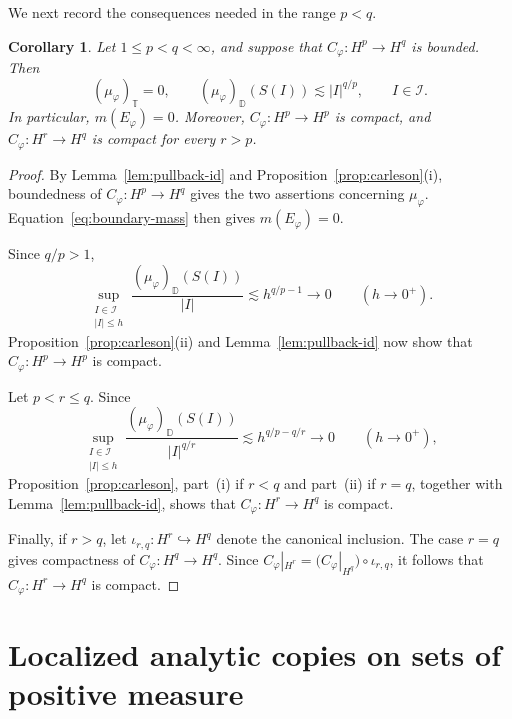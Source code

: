 \documentclass[11pt, reqno]{amsart}
\newtheorem{corollary}[theorem]{Corollary}
\theoremstyle{definition}
\theoremstyle{remark}
\newcommand{\D}{\mathbb{D}}
\newcommand{\T}{\mathbb{T}}
\begin{document}
We next record the consequences needed in the range \(p<q\).

  
\begin{corollary}
\label{cor:boundary-obstruction}
Let \(1\le p<q<\infty\), and suppose that
\(C_\varphi:H^p\to H^q\) is bounded. Then
\[
        (\mu_\varphi)_{\T}=0,
        \qquad
        (\mu_\varphi)_{\D}(S(I))
        \lesssim |I|^{q/p},
        \qquad I\in\mathcal I.
\]
In particular, \(m(E_\varphi)=0\). Moreover,
\(C_\varphi:H^p\to H^p\) is compact, and
\(C_\varphi:H^r\to H^q\) is compact for every \(r>p\).
\end{corollary}

\begin{proof}
By Lemma~\ref{lem:pullback-id} and
Proposition~\ref{prop:carleson}\textup{(i)}, boundedness of
\(C_\varphi:H^p\to H^q\) gives the two assertions concerning
\(\mu_\varphi\). Equation~\eqref{eq:boundary-mass} then
gives \(m(E_\varphi)=0\).

Since \(q/p>1\),
\[
        \sup_{\substack{I\in\mathcal I\\ |I|\le h}}
        \frac{(\mu_\varphi)_{\D}(S(I))}{|I|}
        \lesssim
        h^{q/p-1}
        \longrightarrow0
        \qquad (h\to0^+).
\]
Proposition~\ref{prop:carleson}\textup{(ii)} and
Lemma~\ref{lem:pullback-id} now show that
\(C_\varphi:H^p\to H^p\) is compact.

Let \(p<r\le q\). Since
\[
        \sup_{\substack{I\in\mathcal I\\ |I|\le h}}
        \frac{(\mu_\varphi)_{\D}(S(I))}{|I|^{q/r}}
        \lesssim
        h^{q/p-q/r}
        \longrightarrow0
        \qquad (h\to0^+),
\]
Proposition~\ref{prop:carleson}, part~\textup{(i)} if
\(r<q\) and part~\textup{(ii)} if \(r=q\), together with
Lemma~\ref{lem:pullback-id}, shows that
\(C_\varphi:H^r\to H^q\) is compact.

Finally, if \(r>q\), let
\(\iota_{r,q}:H^r\hookrightarrow H^q\) denote the canonical inclusion.
The case \(r=q\) gives compactness of
\(C_\varphi:H^q\to H^q\). Since
\(C_\varphi|_{H^r}
=
\bigl(C_\varphi|_{H^q}\bigr)\circ\iota_{r,q}\),
it follows that \(C_\varphi:H^r\to H^q\) is compact.
\end{proof}

\section{Localized analytic copies on sets of positive measure}
\label{sec:localization}
\end{document}
